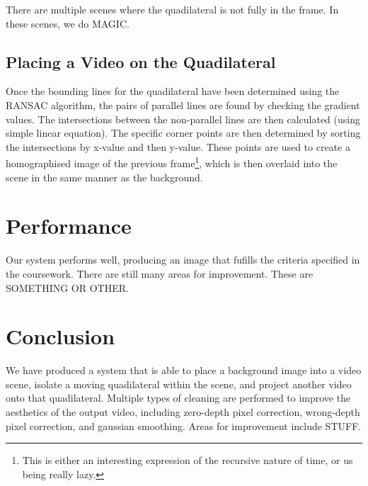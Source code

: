 \documentclass[11pt]{article}
\begin{document}
There are multiple scenes where the quadilateral is not fully in the frame.
In these scenes, we do MAGIC.

\subsection{Placing a Video on the Quadilateral}

Once the bounding lines for the quadilateral have been determined using the
RANSAC algorithm, the pairs of parallel lines are found by checking the
gradient values. The intersections between the non-parallel lines are then
calculated (using simple linear equation). The specific corner points are then
determined by sorting the intersections by x-value and then y-value.  These
points are used to create a homographised image of the previous
frame\footnote{This is either an interesting expression of the recursive nature
of time, or us being really lazy.}, which is then overlaid into the scene in
the same manner as the background.

\section{Performance}

Our system performs well, producing an image that fufills the criteria
specified in the coursework. There are still many areas for improvement. 
These are SOMETHING OR OTHER.

\section{Conclusion}

We have produced a system that is able to place a background image into a video
scene, isolate a moving quadilateral within the scene, and project another
video onto that quadilateral. Multiple types of cleaning are performed to
improve the aesthetics of the output video, including zero-depth pixel
correction, wrong-depth pixel correction, and gaussian smoothing. Areas for
improvement include STUFF.
\end{document}
